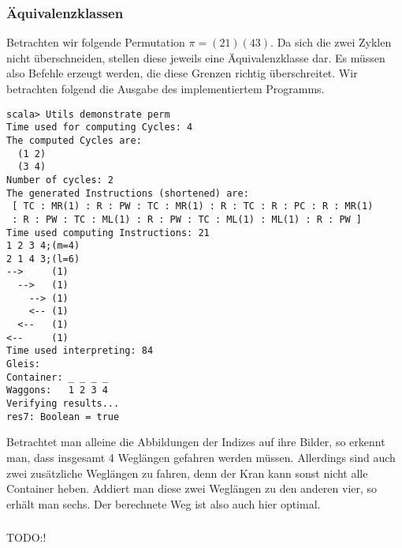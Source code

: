 \subsubsection*{Äquivalenzklassen}
Betrachten wir folgende Permutation $\pi = (2 1) (4 3)$.
Da sich die zwei Zyklen nicht überschneiden, stellen diese jeweils eine Äquivalenzklasse dar.
Es müssen also Befehle erzeugt werden, die diese Grenzen richtig überschreitet.
Wir betrachten folgend die Ausgabe des implementiertem Programms.
\begin{lstlisting}
scala> Utils demonstrate perm                
Time used for computing Cycles: 4
The computed Cycles are: 
  (1 2)
  (3 4)
Number of cycles: 2
The generated Instructions (shortened) are: 
 [ TC : MR(1) : R : PW : TC : MR(1) : R : TC : R : PC : R : MR(1)
 : R : PW : TC : ML(1) : R : PW : TC : ML(1) : ML(1) : R : PW ] 
Time used computing Instructions: 21
1 2 3 4;(m=4)
2 1 4 3;(l=6)
-->     (1)
  -->   (1)
    --> (1)
    <-- (1)
  <--   (1)
<--     (1)
Time used interpreting: 84
Gleis: 
Container: _ _ _ _
Waggons:   1 2 3 4
Verifying results...
res7: Boolean = true
\end{lstlisting}
Betrachtet man alleine die Abbildungen der Indizes auf ihre Bilder, so erkennt man, dass insgesamt 4 Weglängen gefahren werden müssen.
Allerdings sind auch zwei zusätzliche Weglängen zu fahren, denn der Kran kann sonst nicht alle Container heben.
Addiert man diese zwei Weglängen zu den anderen vier, so erhält man sechs.
Der berechnete Weg ist also auch hier optimal.
\subsubsection*{}
TODO:!
